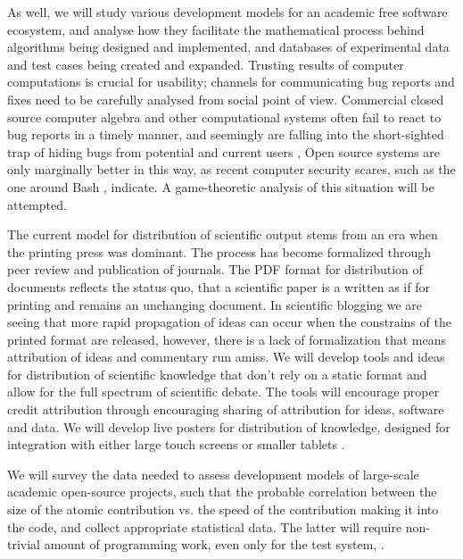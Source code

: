 \begin{workpackage}[id=social-aspects,wphases=0-48,
  title=Social Aspects,
  lead=UO,
  UORM=53,USHRM=8, USORM=6]
\begin{wpdescription}
As well, we will study various development models for an academic free
software ecosystem, and analyse how they facilitate the mathematical
process behind algorithms being designed and implemented, and
databases of experimental data and test cases being created and
expanded.  Trusting results of computer computations is crucial for
usability; channels for communicating bug reports and fixes need to be
carefully analysed from social point of view.  Commercial closed
source computer algebra and other computational systems often fail to
react to bug reports in a timely manner, and seemingly are falling
into the short-sighted trap of hiding bugs from potential and current
users \cite{misfort}, Open source systems are only marginally better
in this way, as recent computer security scares, such as the one
around Bash \cite{shellshock}, indicate.  A game-theoretic analysis of
this situation will be attempted.
\end{wpdescription}

\begin{tasklist}
\begin{task}[title=Modern Distribution of Scientific Output]
   The current model for distribution of scientific output
  stems from an era when the printing press was dominant. The process has become
  formalized through peer review and publication of journals. The PDF format for
  distribution of documents reflects the status quo, that a scientific paper is a written
  as if for printing and remains an unchanging document. In scientific blogging we are
  seeing that more rapid propagation of ideas can occur when the constrains of the printed
  format are released, however, there is a lack of formalization that means attribution of
  ideas and commentary run amiss. We will develop tools and ideas for distribution of
  scientific knowledge that don't rely on a static format and allow for the full spectrum
  of scientific debate. The tools will encourage proper credit attribution through
  encouraging sharing of attribution for ideas, software and data. We will develop live
  posters for distribution of knowledge, designed for integration with either large touch
  screens or smaller tablets .
\end{task}

\begin{task}[title=Survey and collection of needed data,id=datacollection]
We will survey the data needed to assess development models of
large-scale academic open-source projects,
such that the probable correlation between the size of the atomic contribution
vs. the speed of the contribution making it into the code,
and collect appropriate statistical data. The latter will require non-trivial
amount of programming work, even only for the test system, \Sage.
\end{task}


\end{tasklist}
\end{workpackage}
